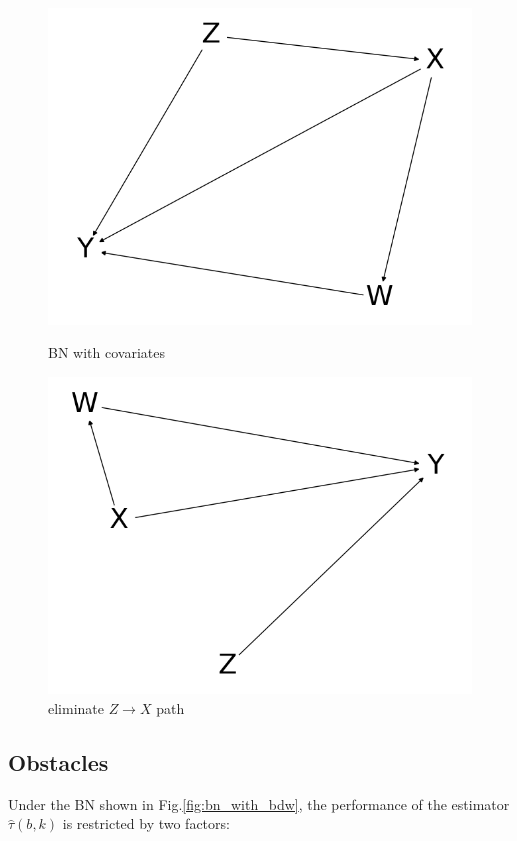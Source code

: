 \documentclass[a4 paper,12pt]{article}
\begin{document}
\begin{figure}[h]
	\centering
	\includegraphics[scale=0.5]{Figure_3.png}
   \caption{BN with covariates}
   \label{bn_with_covar}
	\includegraphics[scale=0.5]{Figure_4.png}
	\caption{eliminate $Z\rightarrow X$ path}
	\label{bn_with_covar2}
\end{figure}

\subsection{Obstacles}
\label{sec:obstacles}

Under the BN shown in Fig.\ref{fig:bn_with_bdw}, the performance of the estimator $\hat \tau(b,k)$ is restricted by two factors:
\end{document}
